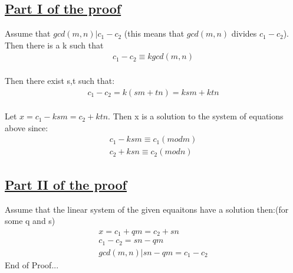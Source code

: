 \documentclass[12pt]{article}
\begin{document}
\subsection*{\underline{Part I of the proof}}
Assume that $gcd(m,n)|c_1-c_2$ (this means that $gcd(m,n)$ divides $c_1-c_2$). Then there is a k such that 
\begin{equation} 
\label{eq7}
\begin{split}
c_1-c_2 \equiv k gcd(m,n)   
\end{split}
\end{equation} \\
Then there exist s,t such that:
\begin{equation} 
\label{eq7}
\begin{split}
c_1-c_2 = k(sm+tn) = ksm+ktn 
\end{split}
\end{equation}\\
Let $x = c_1-ksm = c_2+ktn$. Then x is a solution to the system of equations above since:
\begin{equation} 
\label{eq7}
\begin{split}
c_1-ksm \equiv c_1(mod m) \\
c_2+ksn \equiv c_2(mod n)
\end{split}
\end{equation}
\subsection*{\underline{Part II of the proof}}
Assume that the linear system of the given equaitons have a solution then:(for some q and s)
\begin{equation} 
\label{eq7}
\begin{split}
x = c_1 +qm = c_2 + sn \\
c_1-c_2 = sn-qm\\
gcd(m,n) |sn-qm = c_1-c_2 
\end{split}
\end{equation}
End of Proof...
\end{document}
